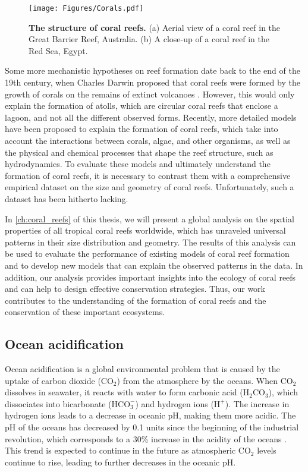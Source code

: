 \begin{figure}[H]
  \centering
  \texttt{[image: Figures/Corals.pdf]}
  \caption[The structure of a coral reef]{
    \textbf{The structure of coral reefs.} (a) Aerial view of a coral reef in
    the Great Barrier Reef, Australia. (b) A close-up of a coral reef in the
    Red Sea, Egypt.}
  \label{fig:Coral_reef}
\end{figure}

Some more mechanistic hypotheses on reef formation date back to the end of
the
19th century, when Charles Darwin proposed that coral reefs were formed by
the
growth of corals on the remains of extinct volcanoes
\cite{darwin1874structure}. However, this would only explain the formation of
atolls, which are circular coral reefs that enclose a lagoon, and not all the
different observed forms. Recently, more detailed models have been proposed
to explain the formation of coral reefs, which take into account the
interactions between corals, algae, and other organisms, as well as the
physical and chemical processes that shape the reef structure, such as
hydrodynamics. To evaluate these models and ultimately understand the
formation of coral reefs, it is necessary to contrast them with a
comprehensive
empirical dataset on the size and geometry of coral reefs. Unfortunately,
such
a dataset has been hitherto lacking.

In \cref{ch:coral_reefs} of this thesis, we will present a global analysis on
the spatial properties of all tropical coral reefs worldwide, which has
unraveled universal patterns in their size distribution and geometry. The
results of this analysis can be used to evaluate the performance of existing
models of coral reef formation and to develop new models that can explain the
observed patterns in the data. In addition, our analysis provides important
insights into the ecology of coral reefs and can help to design effective
conservation strategies. Thus, our work contributes to the understanding of
the
formation of coral reefs and the conservation of these important ecosystems.

\subsection{\label{sec:Ocean acidification} Ocean acidification}

Ocean acidification is a global environmental problem that is caused by the
uptake of carbon dioxide (CO$_2$) from the atmosphere by the oceans. When
CO$_2$ dissolves in seawater, it reacts with water to form carbonic acid
($\textrm{H}_2\textrm{CO}_3$), which dissociates into bicarbonate
($\textrm{HCO}_3^-$) and hydrogen ions ($\textrm{H}^+$). The increase in
hydrogen ions leads to a decrease in oceanic pH, making them more
acidic. The pH of the oceans has decreased by 0.1 units since the beginning
of the industrial revolution, which corresponds to a 30\% increase in the
acidity of the oceans \cite{Orr2005}. This trend is expected to continue in the
future as atmospheric CO$_2$ levels continue to rise, leading to further
decreases in the oceanic pH.

